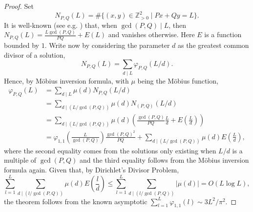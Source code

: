 \documentclass{article}
\begin{document}
	\asymptotic*

\begin{proof}
		Set \[N_{P,Q}(L)=\#\{(x,y)\in\mathbb{Z}_{>0}^2\mid Px+Qy=L\}.\]
		It is well-known (see e.g. \cite[Theorem 6]{BR02}) that, when $\gcd(P,Q)\mid L$, then
		$N_{P,Q}(L)=\frac{L\gcd(P,Q)}{PQ}+E(L)$ and vanishes otherwise. Here $E$ is a function bounded by $1$. Write now by considering the parameter $d$ as the greatest common divisor of a solution,
		\[N_{P,Q}(L)=\sum_{d\mid L}\varphi_{P,Q}(L/d).\]
		Hence, by Möbius inversion formula, with $\mu$ being the Möbius function,
		\begin{align*}\varphi_{P,Q}(L)&=\sum_{d\mid L}\mu(d)N_{P,Q}(L/d)\\&=\sum_{d\mid (L/\gcd(P,Q))}\mu(d)N_{(P,Q)}(L/d)\\&=\sum_{d\mid (L/\gcd(P,Q))}\mu(d)\left(\frac{\gcd(P,Q)}{PQ}\frac{L}{d}+E\left(\frac{L}{d}\right)\right)\\&=\varphi_{1,1}\left(\frac{L}{\gcd(P,Q)}\right)\frac{\gcd(P,Q)^2}{PQ}+\sum_{d\mid (L/\gcd(P,Q))}\mu(d)E\left(\frac{L}{d}\right),
        \end{align*}        
		where the second equality comes from the solutions only existing when $L/d$ is a multiple of $\gcd(P,Q)$ and the third equality follows from the Möbius inversion formula again. Given that, by Dirichlet's Divisor Problem,
        \[
        \sum_{l=1}^L\sum_{d\mid (l/\gcd(P,Q))}\mu(d)E\left(\frac{l}{d}\right)\leq\sum_{l=1}^L\sum_{d\mid (l/\gcd(P,Q))}|\mu(d)|=O(L\log L),
        \]
        the theorem follows from the known asymptotic $\sum_{l=1}^L\varphi_{1,1}(l)\sim3L^2/\pi^2$.
	\end{proof}
\end{document}
